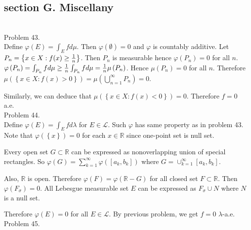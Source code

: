 \subsection*{section G. Miscellany} \hfill \\

Problem 43. \\

Define $\varphi\left( E \right) = \int_E f d\mu$. Then $\varphi(\emptyset) = 0$ and $\varphi$ is countably additive. Let $P_n = \left\{ x\in X : f(x) \geq {1\over n} \right\}$. Then $P_n$ is measurable hence $\varphi\left( P_n \right) = 0$ for all $n$. $\varphi\left( P_n \right) = \int_{P_n} f d\mu \geq {1\over n} \int_{P_n} f d\mu = {1\over n} \mu\left( P_n \right)$. Hence $\mu\left( P_n \right) = 0$ for all $n$.
Therefore $\mu\left( \left\{ x\in X : f(x) > 0 \right\} \right) = \mu\left( \bigcup_{n=1}^{\infty}P_n \right) = 0$.

Similarly, we can deduce that $\mu\left( \left\{ x\in X : f(x) < 0 \right\} \right) = 0$. Therefore $f = 0$ a.e. \\

Problem 44. \\

Define $\varphi\left( E \right) = \int_{E} f d\lambda$ for $E \in \mathcal{L}$. Such $\varphi$ has same property as in problem 43. Note that $\varphi\left( \left\{ x \right\} \right) = 0$ for each $x \in \mathbb{R}$ since one-point set is null set.

Every open set $G \subset \mathbb{R}$ can be expressed as nonoverlapping union of special rectangles. So $\varphi\left( G \right) = \sum_{k=1}^{\infty} \varphi\left( \left[ a_k, b_k \right] \right)$ where $G = \cup_{k=1}^{\infty}\left[ a_k, b_k \right]$.

Also, $\mathbb{R}$ is open. Therefore $\varphi\left( F \right) = \varphi\left( \mathbb{R} - G \right)$ for all closed set $F\subset \mathbb{R}$. Then $\varphi\left( F_{\sigma} \right) = 0$. All Lebesgue measurable set $E$ can be expressed as $F_{\sigma} \cup N$ where $N$ is a null set.

Therefore $\varphi\left( E \right) = 0$ for all $E \in \mathcal{L}$. By previous problem, we get $f = 0$ $\lambda$-a.e. \\

Problem 45. \\


